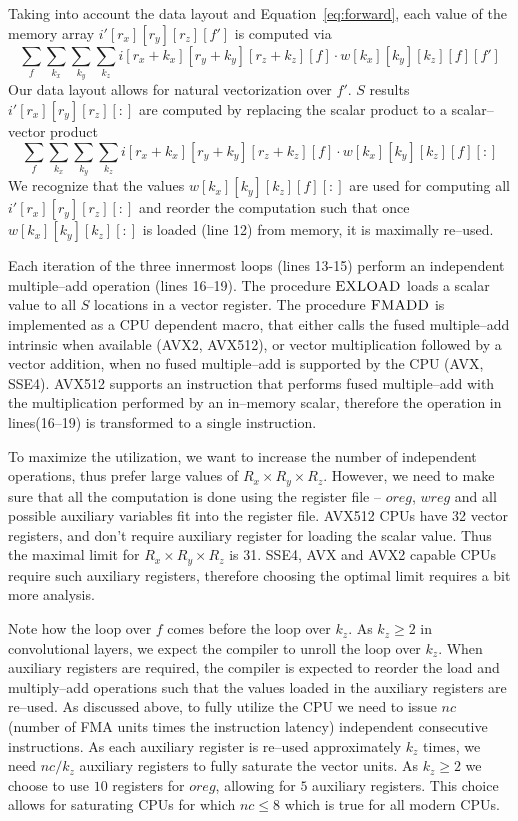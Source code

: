   Taking into account the data layout and Equation~\ref{eq:forward},
  each value of the memory array $i'[r_x][r_y][r_z][f']$ is computed
  via {\footnotesize
  \[
  \sum_{f} \sum_{k_x} \sum_{k_y} \sum_{k_z}
  i[r_x+k_x][r_y+k_y][r_z+k_z][f] \cdot w[k_x][k_y][k_z][f][f']
  \]
  } Our data layout allows for natural vectorization over $f'$.  $S$
  results $i'[r_x][r_y][r_z][:]$ are computed by replacing the scalar
  product to a scalar--vector product {\footnotesize
  \[
  \sum_{f} \sum_{k_x} \sum_{k_y} \sum_{k_z}
  i[r_x+k_x][r_y+k_y][r_z+k_z][f] \cdot w[k_x][k_y][k_z][f][:]
  \]
  } We recognize that the values $w[k_x][k_y][k_z][f][:]$ are used for
  computing all $i'[r_x][r_y][r_z][:]$ and reorder the computation
  such that once $w[k_x][k_y][k_z][:]$ is loaded (line 12) from
  memory, it is maximally re--used.

  Each iteration of the three innermost loops (lines 13-15) perform an
  independent multiple--add operation (lines 16--19).  The procedure
  $\textnormal{\scshape EXLOAD}$ loads a scalar value to all $S$ locations in a
  vector register.  The procedure $\textnormal{\scshape FMADD}$ is implemented as a
  CPU dependent macro, that either calls the fused multiple--add
  intrinsic when available (AVX2, AVX512), or vector multiplication
  followed by a vector addition, when no fused multiple--add is
  supported by the CPU (AVX, SSE4).  AVX512 supports an instruction
  that performs fused multiple--add with the multiplication performed
  by an in--memory scalar, therefore the operation in lines(16--19) is
  transformed to a single instruction.

  To maximize the utilization, we want to increase the number of
  independent operations, thus prefer large values of $R_x \times R_y
  \times R_z$.  However, we need to make sure that all the computation
  is done using the register file -- $oreg$, $wreg$ and all possible
  auxiliary variables fit into the register file.  AVX512 CPUs have 32
  vector registers, and don't require auxiliary register for loading
  the scalar value.  Thus the maximal limit for $R_x \times R_y \times
  R_z$ is 31.  SSE4, AVX and AVX2 capable CPUs require such auxiliary
  registers, therefore choosing the optimal limit requires a bit more
  analysis.

  Note how the loop over $f$ comes before the loop over $k_z$.  As
  $k_z \ge 2$ in convolutional layers, we expect the compiler to
  unroll the loop over $k_z$.  When auxiliary registers are required,
  the compiler is expected to reorder the load and multiply--add
  operations such that the values loaded in the auxiliary registers
  are re--used.  As discussed above, to fully utilize the CPU we need
  to issue $nc$ (number of FMA units times the instruction latency)
  independent consecutive instructions.  As each auxiliary register is
  re--used approximately $k_z$ times, we need $nc/k_z$ auxiliary
  registers to fully saturate the vector units.  As $k_z \ge 2$ we
  choose to use $10$ registers for $oreg$, allowing for $5$ auxiliary
  registers.  This choice allows for saturating CPUs for which $nc \le
  8$ which is true for all modern CPUs.

